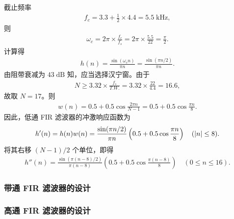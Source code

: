 \begin{solution}
    截止频率
    \begin{align*}
        f_c = 3.3 + \frac{1}{2} \times 4.4 = 5.5\;\mathrm{kHz},
    \end{align*}
    则
    \begin{align*}
        \omega_c = 2\pi \times \frac{f_c}{f_s} = 2\pi \times \frac{5.5}{22} = \frac{\pi}{2}.
    \end{align*}
    计算得
    \begin{align*}
        h(n) = \frac{\sin(\omega_c n)}{\pi n} = \frac{\sin(\pi n / 2)}{\pi n}.
    \end{align*}
    由阻带衰减为 $43\;\mathrm{dB}$ 知，应当选择汉宁窗。由于
    \begin{align*}
        N \ge 3.32 \times \frac{f_s}{T.W.} = 3.32 \times \frac{22}{4.4} = 16.6,
    \end{align*}
    故取 $N = 17$。则
    \begin{align*}
        w(n) = 0.5 + 0.5\cos\frac{2\pi n}{N - 1} = 0.5 + 0.5\cos\frac{\pi n}{8}.
    \end{align*}
    因此，低通 FIR 滤波器的冲激响应函数为
    \begin{align*}
        h'(n) = h(n) w(n) = \frac{\sin(\pi n / 2)}{\pi n} \left(0.5 + 0.5\cos\frac{\pi n}{8}\right) \quad (\left|n\right| \le 8).
    \end{align*}
    将其右移 $(N-1)/2$ 个单位，即得
    \begin{align*}
        h''(n) = \frac{\sin(\pi (n - 8) / 2)}{\pi (n - 8)} \left(0.5 + 0.5\cos\frac{\pi (n - 8)}{8}\right) \quad (0 \le n \le 16).
    \end{align*}
\end{solution}



\subsubsection{带通 FIR 滤波器的设计}


\subsubsection{高通 FIR 滤波器的设计}

